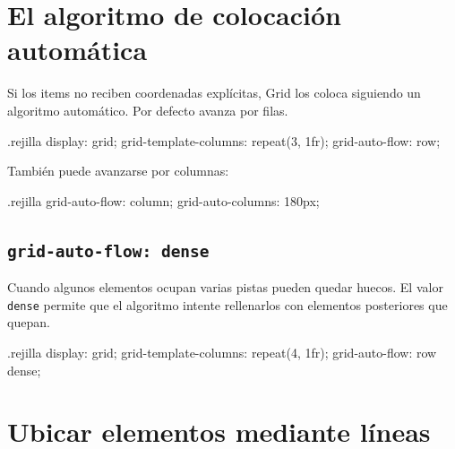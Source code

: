 \documentclass[11pt]{article}
\begin{document}

\section{El algoritmo de colocación automática}

Si los items no reciben coordenadas explícitas, Grid los coloca siguiendo un
algoritmo automático. Por defecto avanza por filas.

\begin{csscodedark}
.rejilla {
    display: grid;
    grid-template-columns: repeat(3, 1fr);
    grid-auto-flow: row;
}
\end{csscodedark}

También puede avanzarse por columnas:

\begin{csscodedark}
.rejilla {
    grid-auto-flow: column;
    grid-auto-columns: 180px;
}
\end{csscodedark}

\subsection{\texttt{grid-auto-flow: dense}}

Cuando algunos elementos ocupan varias pistas pueden quedar huecos. El valor
\texttt{dense} permite que el algoritmo intente rellenarlos con elementos
posteriores que quepan.

\begin{csscodedark}
.rejilla {
    display: grid;
    grid-template-columns: repeat(4, 1fr);
    grid-auto-flow: row dense;
}
\end{csscodedark}


\section{Ubicar elementos mediante líneas}
\end{document}
